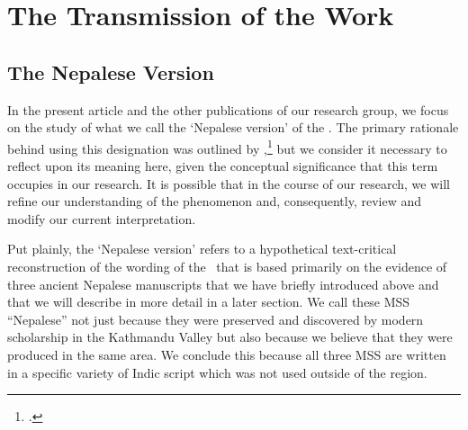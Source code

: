 \chapter{The Transmission of the Work}
\section{The Nepalese Version}

In the present article and the other publications of our research group, we focus
on the study of what we call the `Nepalese version' of the \SS. The primary
rationale behind using this designation was outlined by
\citeauthor{kleb-2021b},\footcite[2--3]{kleb-2021b} but we consider it necessary
to reflect upon its meaning here, given the conceptual significance that this term
occupies in our research. %
It is possible that in the course of our research, we will refine our
understanding of the phenomenon and, consequently, review and modify our current
interpretation.%

Put plainly, the `Nepalese version' refers to a hypothetical text-critical
reconstruction of the wording of the \SS\ that is based primarily on the evidence
of three ancient Nepalese manuscripts that we have briefly introduced above and
that we will describe in more detail in a later section.  We call these MSS
“Nepalese” not just because they were preserved and discovered by modern
scholarship in the Kathmandu Valley but also because we believe that they were
produced in the same area. We conclude this because all three MSS are written in a
specific variety of Indic script which was not used outside of the region.


